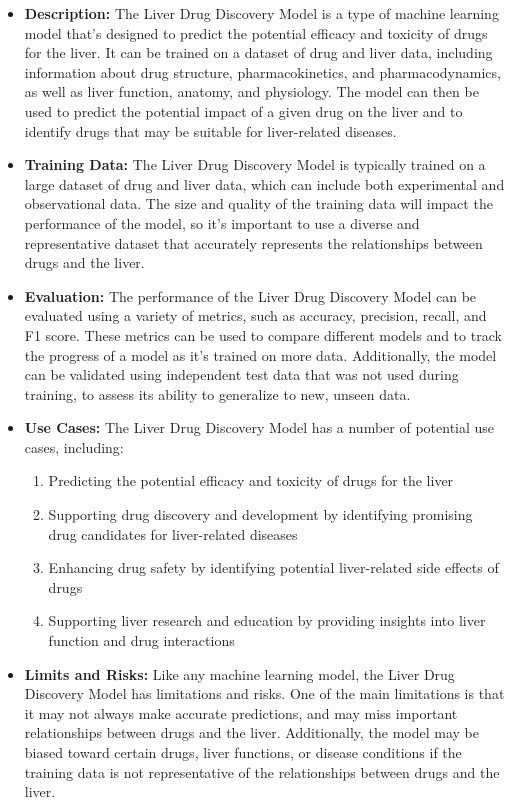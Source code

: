 \begin{itemize}
    \item \textbf{Description:} The Liver Drug Discovery Model is a type of machine learning model that's designed to predict the potential efficacy and toxicity of drugs for the liver. It can be trained on a dataset of drug and liver data, including information about drug structure, pharmacokinetics, and pharmacodynamics, as well as liver function, anatomy, and physiology. The model can then be used to predict the potential impact of a given drug on the liver and to identify drugs that may be suitable for liver-related diseases.
    \item \textbf{Training Data:} The Liver Drug Discovery Model is typically trained on a large dataset of drug and liver data, which can include both experimental and observational data. The size and quality of the training data will impact the performance of the model, so it's important to use a diverse and representative dataset that accurately represents the relationships between drugs and the liver.
    \item \textbf{Evaluation:} The performance of the Liver Drug Discovery Model can be evaluated using a variety of metrics, such as accuracy, precision, recall, and F1 score. These metrics can be used to compare different models and to track the progress of a model as it's trained on more data. Additionally, the model can be validated using independent test data that was not used during training, to assess its ability to generalize to new, unseen data.
    \item \textbf{Use Cases:} The Liver Drug Discovery Model has a number of potential use cases, including:
        \begin{enumerate}  
            \item Predicting the potential efficacy and toxicity of drugs for the liver
            \item Supporting drug discovery and development by identifying promising drug candidates for liver-related diseases
            \item Enhancing drug safety by identifying potential liver-related side effects of drugs
            \item Supporting liver research and education by providing insights into liver function and drug interactions
        \end{enumerate}
    \item \textbf{Limits and Risks:} Like any machine learning model, the Liver Drug Discovery Model has limitations and risks. One of the main limitations is that it may not always make accurate predictions, and may miss important relationships between drugs and the liver. Additionally, the model may be biased toward certain drugs, liver functions, or disease conditions if the training data is not representative of the relationships between drugs and the liver.

\end{itemize}
